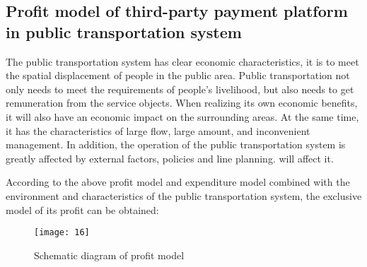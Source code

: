 \documentclass[../mcmpaper]{subfiles}
\begin{document}
\subsection{Profit model of third-party payment platform in public transportation system}
The public transportation system has clear economic characteristics, it is to meet the spatial displacement of people in the public area. Public transportation not only needs to meet the requirements of people's livelihood, but also needs to get remuneration from the service objects. When realizing its own economic benefits, it will also have an economic impact on the surrounding areas. At the same time, it has the characteristics of large flow, large amount, and inconvenient management. In addition, the operation of the public transportation system is greatly affected by external factors, policies and line planning.
will affect it.
\par
According to the above profit model and expenditure model combined with the environment and characteristics of the public transportation system, the exclusive model of its profit can be obtained:
\begin{figure}[!ht]
\centering
\texttt{[image: 16]}
\caption{Schematic diagram of profit model}
\label{fig:5.12}
\end{figure}
\end{document}
